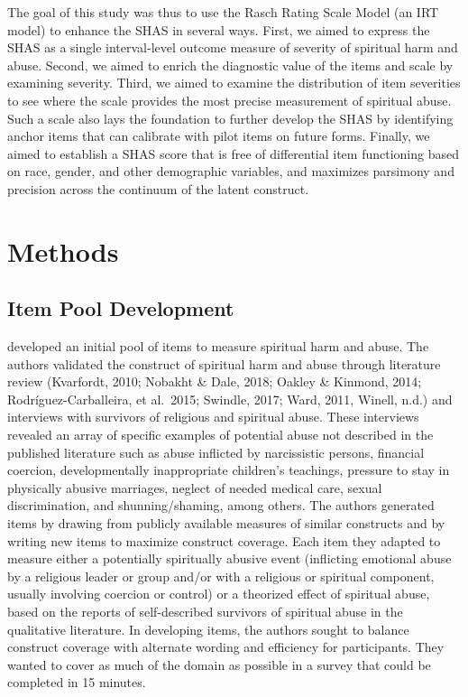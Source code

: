\documentclass[
]{article}
\begin{document}
The goal of this study was thus to use the Rasch Rating Scale Model (an IRT model) to enhance the SHAS in several ways. First, we aimed to express the SHAS as a single interval-level outcome measure of severity of spiritual harm and abuse. Second, we aimed to enrich the diagnostic value of the items and scale by examining severity. Third, we aimed to examine the distribution of item severities to see where the scale provides the most precise measurement of spiritual abuse. Such a scale also lays the foundation to further develop the SHAS by identifying anchor items that can calibrate with pilot items on future forms. Finally, we aimed to establish a SHAS score that is free of differential item functioning based on race, gender, and other demographic variables, and maximizes parsimony and precision across the continuum of the latent construct.

\hypertarget{methods}{%
\section{Methods}\label{methods}}

\hypertarget{item-pool-development}{%
\subsection{Item Pool Development}\label{item-pool-development}}

\citet{KochEdstrom2022} developed an initial pool of items to measure spiritual harm and abuse. The authors validated the construct of spiritual harm and abuse through literature review (Kvarfordt, 2010; Nobakht \& Dale, 2018; Oakley \& Kinmond, 2014; Rodríguez-Carballeira, et al.~2015; Swindle, 2017; Ward, 2011, Winell, n.d.) and interviews with survivors of religious and spiritual abuse. These interviews revealed an array of specific examples of potential abuse not described in the published literature such as abuse inflicted by narcissistic persons, financial coercion, developmentally inappropriate children's teachings, pressure to stay in physically abusive marriages, neglect of needed medical care, sexual discrimination, and shunning/shaming, among others. The authors generated items by drawing from publicly available measures of similar constructs and by writing new items to maximize construct coverage. Each item they adapted to measure either a potentially spiritually abusive event (inflicting emotional abuse by a religious leader or group and/or with a religious or spiritual component, usually involving coercion or control) or a theorized effect of spiritual abuse, based on the reports of self-described survivors of spiritual abuse in the qualitative literature. In developing items, the authors sought to balance construct coverage with alternate wording and efficiency for participants. They wanted to cover as much of the domain as possible in a survey that could be completed in 15 minutes.
\end{document}
